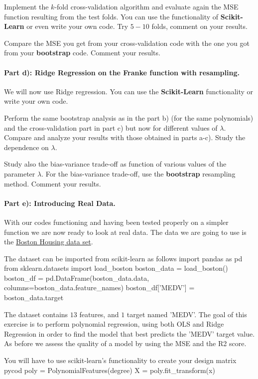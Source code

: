 \documentclass[%
oneside,                 %
final,                   %
10pt]{article}
\begin{document}
Implement the $k$-fold cross-validation algorithm
and evaluate again the MSE function resulting
from the test folds. You can use the functionality of
\textbf{Scikit-Learn} or even write your own code.
Try $5-10$ folds, comment on your results.

Compare the MSE you get from your cross-validation code with the one
you got from your \textbf{bootstrap} code. Comment your results.


\paragraph{Part d): Ridge Regression on the Franke function  with resampling.}
We will now use Ridge regression. You can use the \textbf{Scikit-Learn}
functionality or write your own code.


Perform the same bootstrap analysis as in the
part b)  (for the same polynomials) and the cross-validation part in part c) but now for different values of $\lambda$. Compare and
analyze your results with those obtained in parts a-c). Study the
dependence on $\lambda$.

Study also the bias-variance trade-off as function of various values of
the parameter $\lambda$. For the bias-variance trade-off, use the \textbf{bootstrap} resampling method. Comment your results. 

\paragraph{Part e): Introducing Real Data.}
With our codes functioning and having been tested properly on a
simpler function we are now ready to look at real data.
The data we are going to use is the
\href{{https://www.cs.toronto.edu/~delve/data/boston/bostonDetail.html}}{Boston Housing data set}.

The dataset can be imported from scikit-learn as follows
\bpycod
    import pandas as pd
    from sklearn.datasets import load_boston
    boston_data = load_boston()
    boston_df = pd.DataFrame(boston_data.data, columns=boston_data.feature_names)
    boston_df['MEDV'] = boston_data.target
\epycod


The dataset contains $13$ features, and $1$ target named 'MEDV'.  The
goal of this exercise is to perform polynomial regression, using both
OLS and Ridge Regression in order to find the model that best predicts
the 'MEDV' target value. As before we assess the quality of a model by
using the MSE and the R2 score.

You will have to use scikit-learn's functionality to create your
design matrix
\bccq
pycod poly = PolynomialFeatures(degree)
X = poly.fit_transform(x)
\eccq
\end{document}
